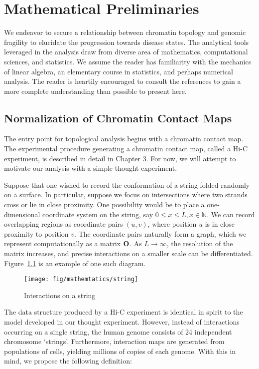 
\chapter{Mathematical Preliminaries}

We endeavor to secure a relationship between chromatin topology and genomic fragility to elucidate the progression towards
disease states.  The analytical tools leveraged in the analysis draw from diverse area of mathematics, computational sciences,
and statistics.  We assume the reader has familiarity with the mechanics of linear algebra, an elementary course in statistics,
and perhaps numerical analysis.  The reader is heartily encouraged to consult the references to gain a more complete understanding than
possible to present here.

\section*{Normalization of Chromatin Contact Maps}

The entry point for topological analysis begins with a chromatin \gls{contact map}.  The experimental procedure generating a chromatin
contact map, called a Hi-C experiment, is described in detail in Chapter 3.  For now, we will attempt to motivate our
analysis with a simple thought experiment.

Suppose that one wished to record the conformation of a string folded randomly on a surface.  In particular, suppose we focus on intersections
where two strands cross or lie in close proximity.  One possibility would be to place a one-dimensional coordinate system on the string, say
$0 \leq  x \leq  L, x \in \mathbb{N}$.  We can record overlapping regions as coordinate pairs $(u,v)$, where position $u$ is in close proximity
to position $v$.  The coordinate pairs naturally form a graph, which we represent computationally as a matrix $\mathbf{O}$.  As $L \rightarrow \infty$,
the resolution of the matrix increases, and precise interactions on a smaller scale can be differentiated.  Figure~\ref{fig:string} is
an example of one such diagram.

\begin{figure}[b]
  \centering
  \caption{Interactions on a string}
  \texttt{[image: fig/mathemtatics/string]}\label{fig:string}
\end{figure}

The data structure produced by a Hi-C experiment is identical in spirit to the model developed in our thought experiment.  However, instead of
interactions occurring on a single string, the human genome consists of 24 independent chromosome `strings'.  Furthermore, interaction maps are
generated from populations of cells, yielding millions of copies of each genome.  With this in mind, we propose the following definition:

